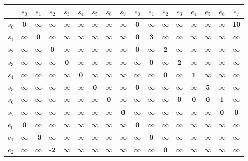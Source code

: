 \documentclass{article}
\theoremstyle{definition}
\begin{document}
\begin{tabular}{c | cccccccccccccccc}
	&$s_0$	&$s_1$ &$s_2$ &$s_3$ &$s_4$ &$s_5$ &$s_6$ &$s_7$ &$e_0$ &$e_1$ &$e_2$ &$e_3$ &$e_4$ &$e_5$ &$e_6$ &$e_7$\\
\hline
$s_0$	&$\textbf{0}$	&$\infty$	&$\infty$	&$\infty$	&$\infty$	&$\infty$	&$\infty$	&$\infty$	&$\textbf{0}$	&$\infty$	&$\infty$	&$\infty$	&$\infty$	&$\infty$	&$\infty$	&$\textbf{10}$\\
$s_1$	&$\infty$	&$\textbf{0}$	&$\infty$	&$\infty$	&$\infty$	&$\infty$	&$\infty$	&$\infty$	&$\textbf{0}$	&$\textbf{3}$	&$\infty$	&$\infty$	&$\infty$	&$\infty$	&$\infty$	&$\infty$\\
$s_2$	&$\infty$	&$\infty$	&$\textbf{0}$	&$\infty$	&$\infty$	&$\infty$	&$\infty$	&$\infty$	&$\textbf{0}$	&$\infty$	&$\textbf{2}$	&$\infty$	&$\infty$	&$\infty$	&$\infty$	&$\infty$\\
$s_3$	&$\infty$	&$\infty$	&$\infty$	&$\textbf{0}$	&$\infty$	&$\infty$	&$\infty$	&$\infty$	&$\infty$	&$\textbf{0}$	&$\infty$	&$\textbf{2}$	&$\infty$	&$\infty$	&$\infty$	&$\infty$\\
$s_4$	&$\infty$	&$\infty$	&$\infty$	&$\infty$	&$\textbf{0}$	&$\infty$	&$\infty$	&$\infty$	&$\infty$	&$\infty$	&$\textbf{0}$	&$\infty$	&$\textbf{1}$	&$\infty$	&$\infty$	&$\infty$\\
$s_5$	&$\infty$	&$\infty$	&$\infty$	&$\infty$	&$\infty$	&$\textbf{0}$	&$\infty$	&$\infty$	&$\textbf{0}$	&$\infty$	&$\infty$	&$\infty$	&$\infty$	&$\textbf{5}$	&$\infty$	&$\infty$\\
$s_6$	&$\infty$	&$\infty$	&$\infty$	&$\infty$	&$\infty$	&$\infty$	&$\textbf{0}$	&$\infty$	&$\infty$	&$\infty$	&$\infty$	&$\textbf{0}$	&$\textbf{0}$	&$\textbf{0}$	&$\textbf{1}$	&$\infty$\\
$s_7$	&$\infty$	&$\infty$	&$\infty$	&$\infty$	&$\infty$	&$\infty$	&$\infty$	&$\textbf{0}$	&$\infty$	&$\infty$	&$\infty$	&$\infty$	&$\infty$	&$\infty$	&$\textbf{0}$	&$\textbf{0}$\\
$e_0$	&$\textbf{0}$	&$\infty$	&$\infty$	&$\infty$	&$\infty$	&$\infty$	&$\infty$	&$\infty$	&$\textbf{0}$	&$\infty$	&$\infty$	&$\infty$	&$\infty$	&$\infty$	&$\infty$	&$\infty$\\
$e_1$	&$\infty$	&$\textbf{-3}$	&$\infty$	&$\infty$	&$\infty$	&$\infty$	&$\infty$	&$\infty$	&$\infty$	&$\textbf{0}$	&$\infty$	&$\infty$	&$\infty$	&$\infty$	&$\infty$	&$\infty$\\
$e_2$	&$\infty$	&$\infty$	&$\textbf{-2}$	&$\infty$	&$\infty$	&$\infty$	&$\infty$	&$\infty$	&$\infty$	&$\infty$	&$\textbf{0}$	&$\infty$	&$\infty$	&$\infty$	&$\infty$	&$\infty$\\

\end{tabular}
\end{document}
